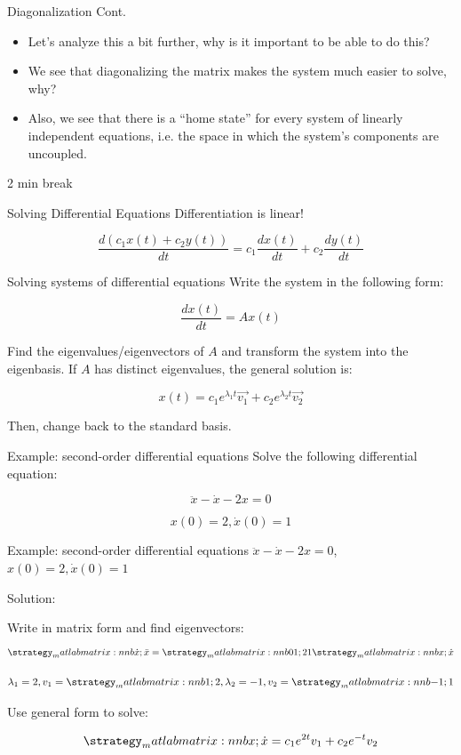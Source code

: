 \documentclass{beamer}
\begin{document}
	\begin{frame}{Diagonalization Cont.}
	    \begin{itemize}
	        \item Let’s analyze this a bit further, why is it important to be able to do this?
            
            \item We see that diagonalizing the matrix makes the system much easier to solve, why? 
            
            \item Also, we see that there is a “home state” for every system of linearly independent equations, i.e. the space in which the system’s components are uncoupled.
	    \end{itemize}
	\end{frame}
	
	\begin{frame}
	    2 min break
	\end{frame}
	
	\begin{frame}{Solving Differential Equations}
	    Differentiation is linear!
	    
	    $$\frac{d(c_1x(t) + c_2y(t))}{dt} = c_1\frac{dx(t)}{dt} + c_2\frac{dy(t)}{dt}$$
	\end{frame}
	
	\begin{frame}{Solving systems of differential equations}
	    Write the system in the following form:

        $$\frac{dx(t)}{dt} = Ax(t)$$
        
        Find the eigenvalues/eigenvectors of $A$ and transform the system into the eigenbasis. If $A$ has distinct eigenvalues, the general solution is:
        
        $$x(t) = c_1e^{\lambda_1{t}}\vec{v_1} + c_2e^{\lambda_2{t}}\vec{v_2}$$
        
        Then, change back to the standard basis.
	\end{frame}
	
	\begin{frame}{Example: second-order differential equations}
	    Solve the following differential equation:

        $$\ddot{x} - \dot{x} - 2x = 0$$
        
        $$x(0) = 2, \dot{x}(0) = 1$$
	\end{frame}
	
	\begin{frame}{Example: second-order differential equations}
	    $\ddot{x} - \dot{x} - 2x = 0$, $x(0) = 2, \dot{x}(0) = 1$
	    
	    Solution:
	    
	    Write in matrix form and find eigenvectors:
	    $$\mat{\dot{x};\ddot{x}} = \mat{0 1; 2 1}\mat{x;\dot{x}}$$
	    
	    $$\lambda_1 = 2, v_1 = \mat{1;2}, \lambda_2 = -1, v_2 = \mat{-1;1}$$
	    
	    Use general form to solve:
	    
	    $$\mat{x;\dot{x}} = c_1e^{2t}v_1 + c_2e^{-t}v_2$$
	\end{frame}
	
\end{document}
